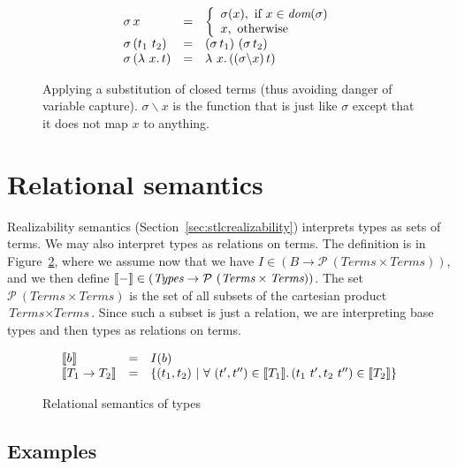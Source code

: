 \begin{figure}
  \[
  \begin{array}{lll}
    \sigma\, x & = & \left\{\begin{array}{ll}
                           \sigma(x),\textnormal{ if }x\in\textit{dom}(\sigma) \\
                           x,\textnormal{ otherwise}
                           \end{array} \right. \\
    \sigma\, (t_1\ t_2) & = & (\sigma\, t_1)\ (\sigma\, t_2) \\
    \sigma\, (\lambda\ x.\, t) & = & \lambda\ x.\, ((\sigma \backslash x)\, t)
  \end{array}
  \]
  \caption{Applying a substitution of closed terms (thus avoiding danger of variable capture).
    $\sigma \backslash x$ is the function that is just like $\sigma$ except that it does not
  map $x$ to anything.}
  
\label{fig:substsigma}
\end{figure}

 
\section{Relational semantics}

Realizability semantics (Section~\ref{sec:stlcrealizability})
interprets types as sets of terms.  We may also interpret types as
relations on terms.  The definition is in Figure~\ref{fig:relsemstlc},
where we assume now that we have $I \in (B \to
\mathcal{P}\ (\textit{Terms} \times \textit{Terms}))$, and we then
define $\llbracket - \rrbracket\in (\textit{Types} \to \mathcal{P}\ (\textit{Terms}
\times \textit{Terms}))$.  The set $\mathcal{P}\ (\textit{Terms} \times
\textit{Terms})$ is the set of all subsets of the cartesian product
$\textit{Terms} \times \textit{Terms}$.  Since such a subset is just a
relation, we are interpreting base types and then types as relations on
terms.

\begin{figure}
  \[
\begin{array}{lll}
   \llbracket b \rrbracket & = & I(b) \\
   \llbracket T_1\to T_2 \rrbracket & = & \{ (t_1,t_2)\ |\ \forall\ (t', t'') \in \llbracket T_1 \rrbracket.\, (t_1\ t', t_2\ t'') \in\llbracket T_2 \rrbracket \}
\end{array}
  \]
\caption{Relational semantics of types}
\label{fig:relsemstlc}
\end{figure}

\subsection{Examples}

